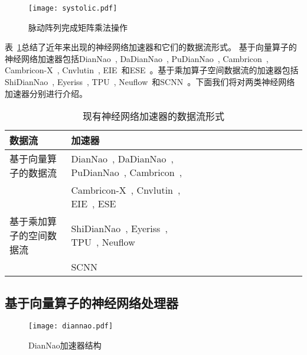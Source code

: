 \begin{figure}[h]
  \centering
  \texttt{[image: systolic.pdf]}
  \caption{\footnotesize 脉动阵列完成矩阵乘法操作}
  \label{fig:systolic}
\end{figure}


表~\ref{tab:dataflow}总结了近年来出现的神经网络加速器和它们的数据流形式。
基于向量算子的神经网络加速器包括DianNao~\cite{chen2014diannao}, DaDianNao~\cite{chen2014dadiannao}, PuDianNao~\cite{liu2015pudiannao}, Cambricon~\cite{liu2016cambricon}, Cambricon-X~\cite{zhang2016cambricon}, Cnvlutin~\cite{albericio2016cnvlutin}, EIE~\cite{han2016eie}和ESE~\cite{han2017ese}。基于乘加算子空间数据流的加速器包括ShiDianNao~\cite{du2015shidiannao}, Eyeriss~\cite{chen2017eyeriss}, TPU~\cite{jouppi2017tpu}, Neuflow~\cite{farabet2011neuflow}和SCNN~\cite{angshuman2017scnn}。下面我们将对两类神经网络加速器分别进行介绍。

\begin{table}[h]
  \footnotesize
  \centering
\caption{\footnotesize 现有神经网络加速器的数据流形式}
\label{tab:dataflow}
\begin{tabular}{@{}lllll@{}llllllll}
  \toprule
  数据流 & 加速器\\
  \midrule
  基于向量算子的数据流 & DianNao~\cite{chen2014diannao}, DaDianNao~\cite{chen2014dadiannao}, PuDianNao~\cite{liu2015pudiannao}, Cambricon~\cite{liu2016cambricon}, \\ 
  ~ & Cambricon-X~\cite{zhang2016cambricon}, Cnvlutin~\cite{albericio2016cnvlutin}, EIE~\cite{han2016eie}, ESE~\cite{han2017ese} \\
  基于乘加算子的空间数据流 & ShiDianNao~\cite{du2015shidiannao}, Eyeriss~\cite{chen2017eyeriss}, TPU~\cite{jouppi2017tpu}, Neuflow~\cite{farabet2011neuflow} \\
  ~& SCNN~\cite{angshuman2017scnn}  \\
\bottomrule
\end{tabular}
\end{table}


\subsection{基于向量算子的神经网络处理器}

\begin{figure}[h]
  \centering
  \texttt{[image: diannao.pdf]}
  \caption{\footnotesize DianNao加速器结构}
  \label{fig:diannao}
\end{figure}


